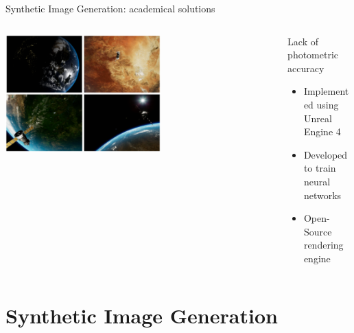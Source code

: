 \documentclass[10pt]{beamer}
\begin{document}
\begin{frame}{Synthetic Image Generation: academical solutions}
\begin{overlayarea}{\textwidth}{0.8\textheight}
  \begin{columns}[T,onlytextwidth]
  \hspace{0.6cm}
    \begin{column}{0.5\textwidth}
        \includegraphics[width=0.58\textwidth]{gfx/URSO.eps}
    \end{column}
    \hspace{-1.5cm}
    \begin{column}{0.5\textwidth}

    \smallskip
        
    Lack of photometric accuracy    

    \smallskip
    
    \begin{itemize}[label=$\bullet$]
      \item Implemented using Unreal Engine 4
      \item Developed to train neural networks
      \item Open-Source rendering engine
    \end{itemize}
    \end{column}
  \end{columns}
\end{overlayarea}
\end{frame}

\section{Synthetic Image Generation}
\begin{frame}[plain]{}
  \sectionpage
\end{frame}
\end{document}
